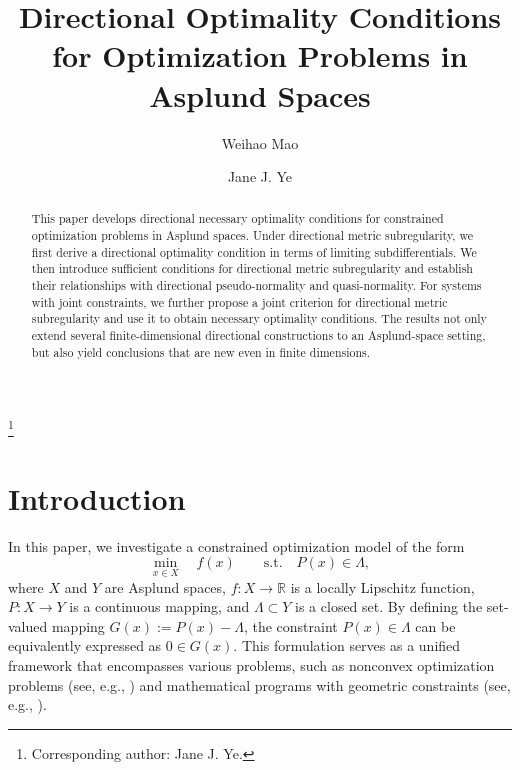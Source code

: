\documentclass[12pt,twoside,reqno]{amsart}
\theoremstyle{definition}
\numberwithin{equation}{section}
\begin{document}
\title[Directional Optimality Conditions for Optimization Problems in Asplund Spaces] 
{Directional Optimality Conditions for Optimization Problems in Asplund Spaces}

\author[W. Mao]{Weihao Mao}
\address{Department of Mathematics and Statistics, University of Victoria, Victoria, BC V8W 2Y2, Canada}

\author[J. J. Ye]{Jane J. Ye}
\address{Department of Mathematics and Statistics, University of Victoria, Victoria, BC V8W 2Y2, Canada}
\thanks{Corresponding author: Jane J. Ye.}


\begin{abstract}
This paper develops directional necessary optimality conditions for constrained optimization problems in Asplund spaces. Under directional metric subregularity, we first derive a directional optimality condition in terms of limiting subdifferentials. We then introduce sufficient conditions for directional metric subregularity and establish their relationships with directional pseudo-normality and quasi-normality. For systems with joint constraints, we further propose a joint criterion for directional metric subregularity and use it to obtain necessary optimality conditions. The results not only extend several finite-dimensional directional constructions to an Asplund-space setting, but also yield conclusions that are new even in finite dimensions.
\end{abstract}

\maketitle

\section{Introduction}
In this paper, we investigate a constrained optimization model of the form
\begin{equation}\label{eq:basic_model}
    \min_{x \in X} \quad f(x) \qquad \text{s.t.} \quad P(x) \in \Lambda,
\end{equation}
where $X$ and $Y$ are Asplund spaces, $f: X \to \mathbb{R}$ is a locally Lipschitz function, $P: X \to Y$ is a continuous mapping, and $\Lambda \subset Y$ is a closed set. By defining the set-valued mapping $G(x) := P(x) - \Lambda$, the constraint $P(x) \in \Lambda$ can be equivalently expressed as $0 \in G(x)$. 
This formulation serves as a unified framework that encompasses various problems, such as nonconvex optimization problems (see, e.g., \cite{bonnans2013perturbation}) and mathematical programs with geometric constraints (see, e.g., \cite{guo2013mathematical}). 
 
\end{document}
